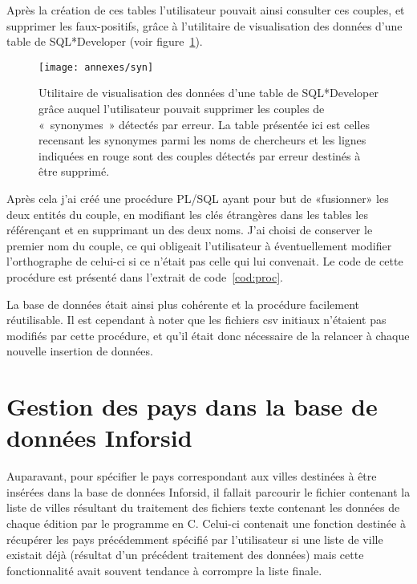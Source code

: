 			Après la création de ces tables l'utilisateur pouvait ainsi consulter ces couples, et supprimer les faux-positifs, grâce à l'utilitaire de visualisation des données d'une table de SQL*Developer (voir figure~\ref{fig:syn}).
			
			\begin{figure}
				\centering
				\texttt{[image: annexes/syn]}
				\caption{Utilitaire de visualisation des données d'une table de SQL*Developer grâce auquel l'utilisateur pouvait supprimer les couples de «~synonymes~» détectés par erreur. La table présentée ici est celles recensant les synonymes parmi les noms de chercheurs et les lignes indiquées en rouge sont des couples détectés par erreur destinés à être supprimé.}\label{fig:syn}
			\end{figure}
			
			 Après cela j'ai créé une procédure PL/SQL ayant pour but de «fusionner» les deux entités du couple, en modifiant les clés étrangères dans les tables les référençant et en supprimant un des deux noms. J'ai choisi de conserver le premier nom du couple, ce qui obligeait l'utilisateur à éventuellement modifier l'orthographe de celui-ci si ce n'était pas celle qui lui convenait. Le code de cette procédure est présenté dans l'extrait de code~\ref{cod:proc}.
			
			
			 
			 La base de données était ainsi plus cohérente et la procédure facilement réutilisable. Il est cependant à noter que les fichiers csv initiaux n'étaient pas modifiés par cette procédure, et qu'il était donc nécessaire de la relancer à chaque nouvelle insertion de données.

		 		 
			 
		\section*{Gestion des pays dans la base de données Inforsid}
			Auparavant, pour spécifier le pays correspondant aux villes destinées à être insérées dans la base de données Inforsid, il fallait parcourir le fichier contenant la liste de villes résultant du traitement des fichiers texte contenant les données de chaque édition par le programme en C. Celui-ci contenait une fonction destinée à récupérer les pays précédemment spécifié par l'utilisateur si une liste de ville existait déjà (résultat d'un précédent traitement des données) mais cette fonctionnalité avait souvent tendance à corrompre la liste finale.
			
